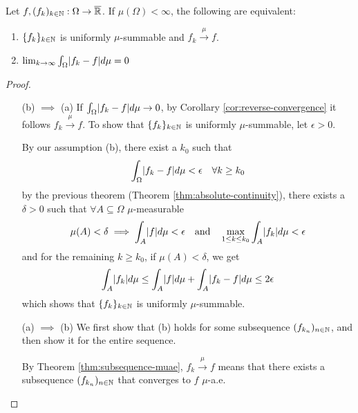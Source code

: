 \begin{thm}
  Let $f,(f_k)_{k \in \mathbb{N}}: \Omega \to \overline{\mathbb{R}}$.
  If $\mu(\Omega) < \infty$, the following are equivalent:
  \begin{enumerate}
    \item $\{f_k\}_{k \in \mathbb{N}}$ is uniformly $\mu$-summable and $f_k \stackrel{\mu}{\to} f$.
    \item $\lim_{k \to \infty} \int_{\Omega} \abs{f_k -f} d \mu = 0$
  \end{enumerate}
\end{thm}
\begin{proof}
  \phantom{a}
\begin{itemize}
  \item[(b) $\implies$ (a)]
    If $\int_{\Omega} \abs{f_k -f} d \mu \to 0$, by Corollary \ref{cor:reverse-convergence} it follows $f_k \stackrel{\mu}{\to} f$.
    To show that $\{f_k\}_{k \in \mathbb{N}}$ is uniformly $\mu$-summable, let $\epsilon > 0$.

    By our assumption (b), there exist a $k_0$ such that
    \begin{align*}
      \int_{\Omega} \abs{f_k - f} d \mu < \epsilon \quad \forall k \geq k_0
    \end{align*}
    by the previous theorem (Theorem \ref{thm:absolute-continuity}), there exists a $\delta > 0$ such that $\forall A \subseteq \Omega$ $\mu$-measurable
    \begin{align*}
      \mu(A) < \delta \implies \int_{A} \abs{f} d \mu < \epsilon \quad \text{and} \quad \max_{1 \leq k \leq k_0}\int_{A} \abs{f_k} d \mu < \epsilon
    \end{align*}
    and for the remaining $k \geq k_0$, if $\mu(A) < \delta$, we get
    \begin{align*}
      \int_{A} \abs{f_k} d \mu \leq \int_{A}  \abs{f} d \mu + \int_{A} \abs{f_k - f} d \mu \leq 2 \epsilon
    \end{align*}
  which shows that $\{f_k\}_{k \in \mathbb{N}}$ is uniformly $\mu$-summable.

  \item[(a) $\implies$ (b)]
    We first show that (b) holds for some subsequence $(f_{k_n})_{n \in \mathbb{N}}$, and then show it for the entire sequence.

    By Theorem \ref{thm:subsequence-muae}, $f_k \stackrel{\mu}{\to} f$ means that there exists a subsequence $(f_{k_n})_{n \in \mathbb{N}}$ that converges to $f$ $\mu$-a.e.


\end{itemize}
\end{proof}

